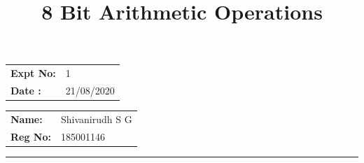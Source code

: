 \documentclass[12pt,a4paper]{article}
\title{\bf 8 Bit Arithmetic Operations}
\author{\vspace{-10ex}}
\date{\vspace{-10ex}}
\begin{document}
\maketitle

\begin{minipage}{0.45\textwidth}
        \begin{tabular}{l l}
            \textbf{Expt No:}&1\\
            \textbf{Date :}&21/08/2020
        \end{tabular}
\end{minipage}%
\begin{minipage}{0.45\textwidth}
        \begin{tabular}{l l}
             \textbf{Name:}& Shivanirudh S G  \\
             \textbf{Reg No:} & 185001146 
        \end{tabular}
\end{minipage}
\vspace{1cm}
\hrule
\end{document}
